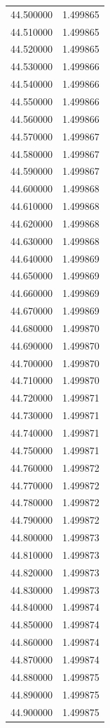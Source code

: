 \begin{tabular}{rr}
44.500000 & 1.499865 \\
44.510000 & 1.499865 \\
44.520000 & 1.499865 \\
44.530000 & 1.499866 \\
44.540000 & 1.499866 \\
44.550000 & 1.499866 \\
44.560000 & 1.499866 \\
44.570000 & 1.499867 \\
44.580000 & 1.499867 \\
44.590000 & 1.499867 \\
44.600000 & 1.499868 \\
44.610000 & 1.499868 \\
44.620000 & 1.499868 \\
44.630000 & 1.499868 \\
44.640000 & 1.499869 \\
44.650000 & 1.499869 \\
44.660000 & 1.499869 \\
44.670000 & 1.499869 \\
44.680000 & 1.499870 \\
44.690000 & 1.499870 \\
44.700000 & 1.499870 \\
44.710000 & 1.499870 \\
44.720000 & 1.499871 \\
44.730000 & 1.499871 \\
44.740000 & 1.499871 \\
44.750000 & 1.499871 \\
44.760000 & 1.499872 \\
44.770000 & 1.499872 \\
44.780000 & 1.499872 \\
44.790000 & 1.499872 \\
44.800000 & 1.499873 \\
44.810000 & 1.499873 \\
44.820000 & 1.499873 \\
44.830000 & 1.499873 \\
44.840000 & 1.499874 \\
44.850000 & 1.499874 \\
44.860000 & 1.499874 \\
44.870000 & 1.499874 \\
44.880000 & 1.499875 \\
44.890000 & 1.499875 \\
44.900000 & 1.499875 \\

\end{tabular}
